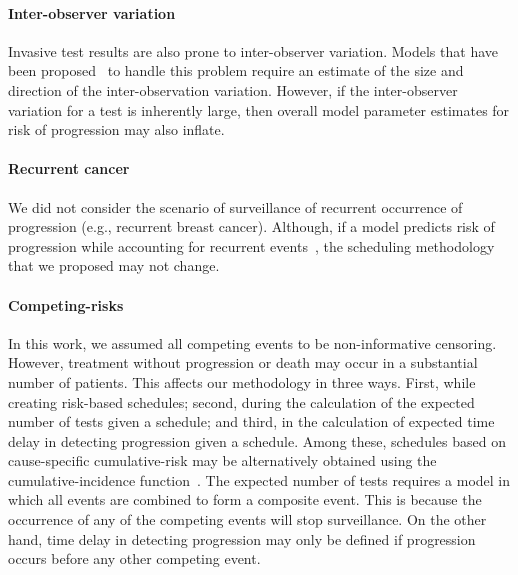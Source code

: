 \paragraph{Inter-observer variation} Invasive test results are also prone to inter-observer variation. Models that have been proposed~\citep{balasubramanian2003estimation} to handle this problem require an estimate of the size and direction of the inter-observation variation. However, if the inter-observer variation for a test is inherently large, then overall model parameter estimates for risk of progression may also inflate.

\paragraph{Recurrent cancer} We did not consider the scenario of surveillance of recurrent occurrence of progression (e.g., recurrent breast cancer). Although, if a model predicts risk of progression while accounting for recurrent events~\citep{rizopoulos2012joint}, the scheduling methodology that we proposed may not change.

\paragraph{Competing-risks} In this work, we assumed all competing events to be non-informative censoring. However, treatment without progression or death may occur in a substantial number of patients. This affects our methodology in three ways. First, while creating risk-based schedules; second, during the calculation of the expected number of tests given a schedule; and third, in the calculation of expected time delay in detecting progression given a schedule. Among these, schedules based on cause-specific cumulative-risk may be alternatively obtained using the cumulative-incidence function~\citep{andrinopoulou2017combined, putter2007tutorial}. The expected number of tests requires a model in which all events are combined to form a composite event. This is because the occurrence of any of the competing events will stop surveillance. On the other hand, time delay in detecting progression may only be defined if progression occurs before any other competing event.


